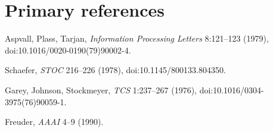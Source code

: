 \documentclass[10pt]{article}
\begin{document}
\section{Primary references}
\noindent Aspvall, Plass, Tarjan, \emph{Information Processing Letters} 8:121--123 (1979), doi:10.1016/0020-0190(79)90002-4.
\par\noindent Schaefer, \emph{STOC} 216--226 (1978), doi:10.1145/800133.804350.
\par\noindent Garey, Johnson, Stockmeyer, \emph{TCS} 1:237--267 (1976), doi:10.1016/0304-3975(76)90059-1.
\par\noindent Freuder, \emph{AAAI} 4--9 (1990).
\end{document}
